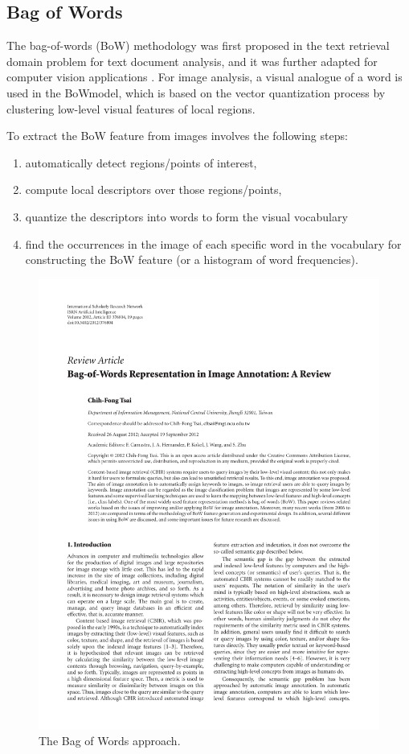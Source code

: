 \subsection{Bag of Words}
The bag-of-words (BoW) methodology was first proposed in the text retrieval domain problem for text document analysis, and it was further adapted for computer vision applications \cite{bosch2007best}. For image analysis, a visual analogue of a word is used in the BoWmodel, which is based on the vector quantization process by clustering low-level visual features of local regions. 

To extract the BoW feature from images involves the following steps: 
\begin{enumerate}
\item automatically detect regions/points of interest,
\item compute local descriptors over those regions/points,
\item quantize the descriptors into words to form the visual vocabulary
\item find the occurrences in the image of each specific word in the vocabulary for constructing the BoW feature (or a histogram of word frequencies).
\end{enumerate}

\begin{figure}[htbp]
	\centering
		\includegraphics[page=3]{Figures/376804_cropped.pdf}
	\caption{The Bag of Words approach.}
	\label{fig:BoW}
\end{figure}

